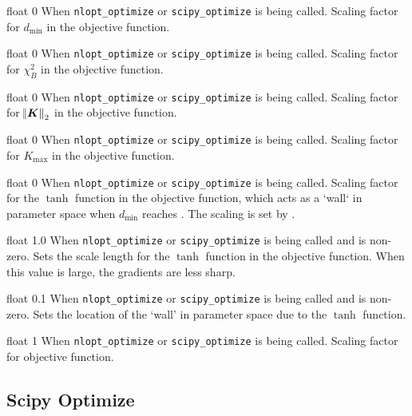 \myhrule

{float}
{0}
{When \texttt{nlopt\_optimize} or \texttt{scipy\_optimize} is being called.}
{Scaling factor for $d_{\text{min}}$ in the objective function.}

\myhrule

{float}
{0}
{When \texttt{nlopt\_optimize} or \texttt{scipy\_optimize} is being called.}
{Scaling factor for $\chi^2_B$ in the objective function.}

\myhrule

{float}
{0}
{When \texttt{nlopt\_optimize} or \texttt{scipy\_optimize} is being called.}
{Scaling factor for $\norm{\bm{K}}_2$ in the objective function.}

\myhrule

{float}
{0}
{When \texttt{nlopt\_optimize} or \texttt{scipy\_optimize} is being called.}
{Scaling factor for $K_{\max}$ in the objective function.}

\myhrule

{float}
{0}
{When \texttt{nlopt\_optimize} or \texttt{scipy\_optimize} is being called.}
{Scaling factor for the $\tanh$ function in the objective function, which acts as a `wall` in parameter space when $d_{\min}$ reaches . The scaling is set by .}

\myhrule

{float}
{1.0}
{When \texttt{nlopt\_optimize} or \texttt{scipy\_optimize} is being called and  is non-zero.}
{Sets the scale length for the $\tanh$ function in the objective function. When this value is large, the gradients are less sharp.}

\myhrule

{float}
{0.1}
{When \texttt{nlopt\_optimize} or \texttt{scipy\_optimize} is being called and  is non-zero.}
{Sets the location of the `wall' in parameter space due to the $\tanh$ function.}

\myhrule

{float}
{1}
{When \texttt{nlopt\_optimize} or \texttt{scipy\_optimize} is being called.}
{Scaling factor for objective function.}

\myhrule

\subsection{Scipy Optimize}

